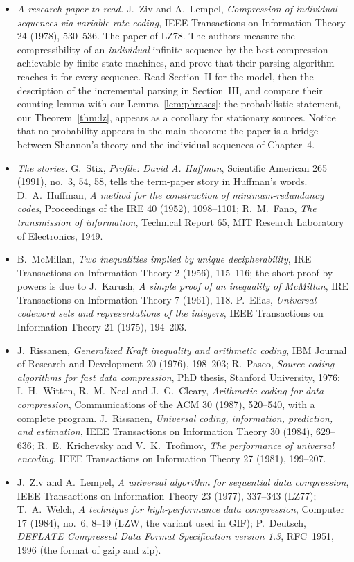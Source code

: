 \begin{itemize}
\item \emph{A research paper to read.} J.~Ziv and A.~Lempel, \emph{Compression of individual sequences via variable-rate coding}, IEEE Transactions on Information Theory 24 (1978), 530--536. The paper of LZ78. The authors measure the compressibility of an \emph{individual} infinite sequence by the best compression achievable by finite-state machines, and prove that their parsing algorithm reaches it for every sequence. Read Section~II for the model, then the description of the incremental parsing in Section~III, and compare their counting lemma with our Lemma~\ref{lem:phrases}; the probabilistic statement, our Theorem~\ref{thm:lz}, appears as a corollary for stationary sources. Notice that no probability appears in the main theorem: the paper is a bridge between Shannon's theory and the individual sequences of Chapter~4.
\item \emph{The stories.} G.~Stix, \emph{Profile: David A. Huffman}, Scientific American 265 (1991), no.~3, 54, 58, tells the term-paper story in Huffman's words. D.~A.~Huffman, \emph{A method for the construction of minimum-redundancy codes}, Proceedings of the IRE 40 (1952), 1098--1101; R.~M.~Fano, \emph{The transmission of information}, Technical Report 65, MIT Research Laboratory of Electronics, 1949.
\item B.~McMillan, \emph{Two inequalities implied by unique decipherability}, IRE Transactions on Information Theory 2 (1956), 115--116; the short proof by powers is due to J.~Karush, \emph{A simple proof of an inequality of McMillan}, IRE Transactions on Information Theory 7 (1961), 118. P.~Elias, \emph{Universal codeword sets and representations of the integers}, IEEE Transactions on Information Theory 21 (1975), 194--203.
\item J.~Rissanen, \emph{Generalized Kraft inequality and arithmetic coding}, IBM Journal of Research and Development 20 (1976), 198--203; R.~Pasco, \emph{Source coding algorithms for fast data compression}, PhD thesis, Stanford University, 1976; I.~H.~Witten, R.~M.~Neal and J.~G.~Cleary, \emph{Arithmetic coding for data compression}, Communications of the ACM 30 (1987), 520--540, with a complete program. J.~Rissanen, \emph{Universal coding, information, prediction, and estimation}, IEEE Transactions on Information Theory 30 (1984), 629--636; R.~E.~Krichevsky and V.~K.~Trofimov, \emph{The performance of universal encoding}, IEEE Transactions on Information Theory 27 (1981), 199--207.
\item J.~Ziv and A.~Lempel, \emph{A universal algorithm for sequential data compression}, IEEE Transactions on Information Theory 23 (1977), 337--343 (LZ77); T.~A.~Welch, \emph{A technique for high-performance data compression}, Computer 17 (1984), no.~6, 8--19 (LZW, the variant used in GIF); P.~Deutsch, \emph{DEFLATE Compressed Data Format Specification version 1.3}, RFC~1951, 1996 (the format of gzip and zip).

\end{itemize}
